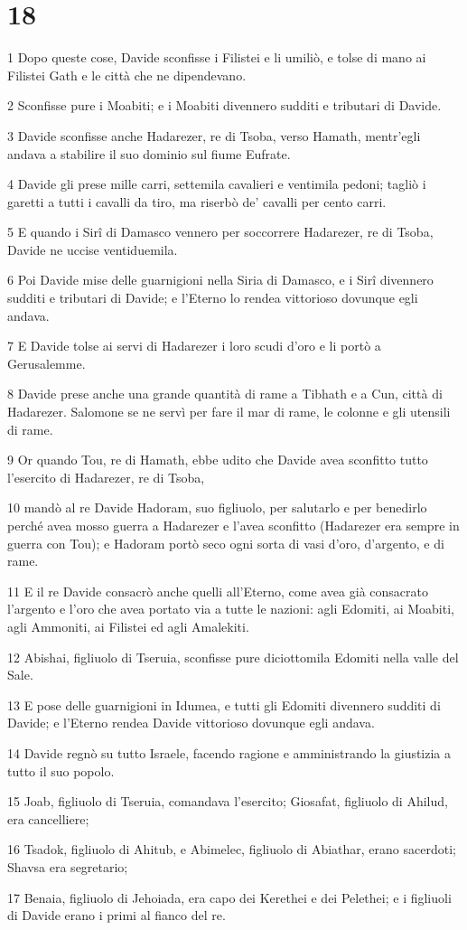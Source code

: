 \chapter{18}

\par 1 Dopo queste cose, Davide sconfisse i Filistei e li umiliò, e tolse di mano ai Filistei Gath e le città che ne dipendevano.
\par 2 Sconfisse pure i Moabiti; e i Moabiti divennero sudditi e tributari di Davide.
\par 3 Davide sconfisse anche Hadarezer, re di Tsoba, verso Hamath, mentr'egli andava a stabilire il suo dominio sul fiume Eufrate.
\par 4 Davide gli prese mille carri, settemila cavalieri e ventimila pedoni; tagliò i garetti a tutti i cavalli da tiro, ma riserbò de' cavalli per cento carri.
\par 5 E quando i Sirî di Damasco vennero per soccorrere Hadarezer, re di Tsoba, Davide ne uccise ventiduemila.
\par 6 Poi Davide mise delle guarnigioni nella Siria di Damasco, e i Sirî divennero sudditi e tributari di Davide; e l'Eterno lo rendea vittorioso dovunque egli andava.
\par 7 E Davide tolse ai servi di Hadarezer i loro scudi d'oro e li portò a Gerusalemme.
\par 8 Davide prese anche una grande quantità di rame a Tibhath e a Cun, città di Hadarezer. Salomone se ne servì per fare il mar di rame, le colonne e gli utensili di rame.
\par 9 Or quando Tou, re di Hamath, ebbe udito che Davide avea sconfitto tutto l'esercito di Hadarezer, re di Tsoba,
\par 10 mandò al re Davide Hadoram, suo figliuolo, per salutarlo e per benedirlo perché avea mosso guerra a Hadarezer e l'avea sconfitto (Hadarezer era sempre in guerra con Tou); e Hadoram portò seco ogni sorta di vasi d'oro, d'argento, e di rame.
\par 11 E il re Davide consacrò anche quelli all'Eterno, come avea già consacrato l'argento e l'oro che avea portato via a tutte le nazioni: agli Edomiti, ai Moabiti, agli Ammoniti, ai Filistei ed agli Amalekiti.
\par 12 Abishai, figliuolo di Tseruia, sconfisse pure diciottomila Edomiti nella valle del Sale.
\par 13 E pose delle guarnigioni in Idumea, e tutti gli Edomiti divennero sudditi di Davide; e l'Eterno rendea Davide vittorioso dovunque egli andava.
\par 14 Davide regnò su tutto Israele, facendo ragione e amministrando la giustizia a tutto il suo popolo.
\par 15 Joab, figliuolo di Tseruia, comandava l'esercito; Giosafat, figliuolo di Ahilud, era cancelliere;
\par 16 Tsadok, figliuolo di Ahitub, e Abimelec, figliuolo di Abiathar, erano sacerdoti; Shavsa era segretario;
\par 17 Benaia, figliuolo di Jehoiada, era capo dei Kerethei e dei Pelethei; e i figliuoli di Davide erano i primi al fianco del re.

